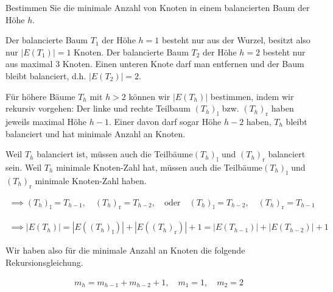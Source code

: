 
\begin{exercise}

Bestimmen Sie die minimale Anzahl von Knoten in einem balancierten Baum der Höhe $h$.

\end{exercise}


\begin{solution}

\phantom{}


Der balancierte Baum $T_1$ der Höhe $h = 1$ besteht nur aus der Wurzel, besitzt also nur $|E(T_1)| = 1$ Knoten.
Der balancierte Baum $T_2$ der Höhe $h = 2$ besteht nur aus maximal $3$ Knoten.
Einen unteren Knote darf man entfernen und der Baum bleibt balanciert, d.h. $|E(T_2)| = 2$.

Für höhere Bäume $T_h$ mit $h > 2$ können wir $|E(T_h)|$ bestimmen, indem wir rekursiv vorgehen:
Der linke und rechte Teilbaum $(T_h)_\mathrm{l}$ bzw. $(T_h)_\mathrm{r}$ haben jeweils maximal Höhe $h-1$.
Einer davon darf sogar Höhe $h-2$ haben, $T_h$ bleibt balanciert und hat minimale Anzahl an Knoten.

Weil $T_h$ balanciert ist, müssen auch die Teilbäume$(T_h)_\mathrm{l}$ und $(T_h)_\mathrm{r}$ balanciert sein.
Weil $T_h$ minimale Knoten-Zahl hat, müssen auch die Teilbäume$(T_h)_\mathrm{l}$ und $(T_h)_\mathrm{r}$ minimale Knoten-Zahl haben.

\begin{align*}
  \implies
  (T_h)_\mathrm{l} = T_{h-1},
  \quad
  (T_h)_\mathrm{r} = T_{h-2},
  \quad
  \text{oder}
  \quad  
  (T_h)_\mathrm{l} = T_{h-2},
  \quad
  (T_h)_\mathrm{r} = T_{h-1}
\end{align*}

\begin{align*}
  \implies
  |E(T_h)|
  =
  |E((T_h)_\mathrm{l})| + |E((T_h)_\mathrm{r})| + 1
  =
  |E(T_{h-1})| + |E(T_{h-2})| + 1
\end{align*}

Wir haben also für die minimale Anzahl an Knoten die folgende Rekursionsgleichung.

\begin{align*}
  m_h = m_{h-1} + m_{h-2} + 1,
  \quad
  m_1 = 1,
  \quad
  m_2 = 2
\end{align*}


\end{solution}

